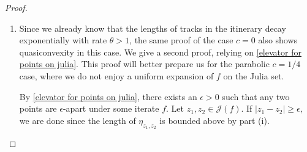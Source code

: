 \begin{proof}
\begin{enumerate}[label=\normalfont(\roman*)]

\item Since we already know that the lengths of tracks in the itinerary decay exponentially with rate $\theta>1$, the same proof of the case $c=0$ also shows quasiconvexity in this case.
We give a second proof, relying on \cref{elevator for points on julia}. This proof will better prepare us for the parabolic $c=1/4$ case, where we do not enjoy a uniform expansion of $f$ on the Julia set.

By \cref{elevator for points on julia}, there exists an $\epsilon>0$ such that any two points are $\epsilon$-apart under some iterate $f$. 
Let $z_{1},z_{2}\in\mathcal{J}(f)$. If $\left|z_{1}-z_{2}\right|\geq\epsilon,$ we are done since the length of $\eta_{z_1,z_2}$ is bounded above by part (i).

\begin{comment}
Explicitly, if $\Length\left(\eta_{z}\right)\leq L$
for all $z\in\mathcal{J}$ then we take $A\geq\frac{2L}{\epsilon}$
and then automatically $\Length\left(\eta_{z_{1}}+\eta_{z_{2}}\right)\leq A\left|z_{1}-z_{2}\right|$.
\end{comment}


\end{enumerate}
\end{proof}

